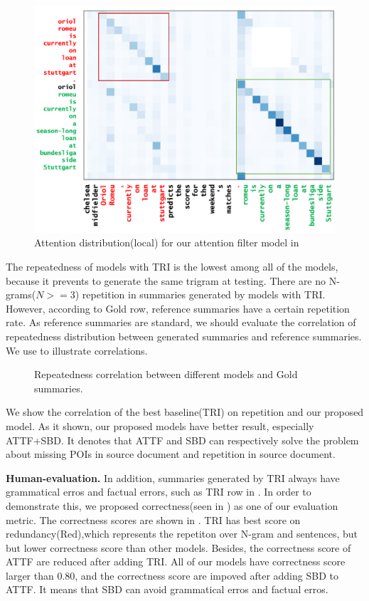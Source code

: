 \begin{figure}[th!]
\centering
\includegraphics[width=0.9\linewidth]{map3}
\caption{Attention distribution(local) for our attention filter model in }
\label{fig:attn_map3}
\end{figure}

The repeatedness of models with TRI is the lowest among all of the models, because it
prevents to generate the same trigram at testing. There are no N-grams($N>=3$) repetition
in summaries generated by models with TRI. 
However, according to Gold row, reference summaries have a certain repetition rate.
As reference summaries are standard, we should evaluate the correlation
of repeatedness distribution between
generated summaries and reference summaries. 
We use  to illustrate correlations.

\begin{figure}[th!]
\centering
\caption{Repeatedness correlation between different models and Gold summaries.}
\label{fig:repcor}
\end{figure}

We show the correlation of the best baseline(TRI) on repetition 
and our proposed model.
As it shown,
our proposed models have better result, especially ATTF+SBD.
It denotes that ATTF and SBD can respectively solve the problem about
missing POIs in source document and repetition in source document.

\textbf{Human-evaluation.}
In addition, summaries generated by TRI always have grammatical erros
and factual errors, such as TRI row in .
In order to demonstrate this, we proposed correctness(seen in ) as
one of our evaluation metric. The correctness scores
are shown in . 
TRI has best score on redundancy(Red),which represents the repetiton over N-gram and sentences, but
but lower correctness score than other models.
Besides, the correctness score of ATTF are reduced after adding TRI.
All of our models have correctness score larger than 0.80, and
the correctness score are impoved after adding SBD to ATTF.
It means that SBD can avoid grammatical erros and factual erros.

